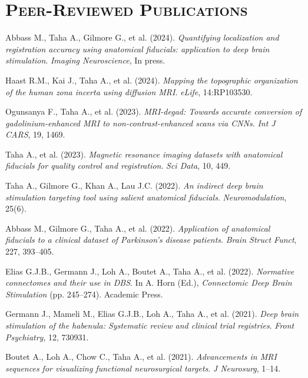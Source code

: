 \section*{\textsc{Peer-Reviewed Publications}} \noindent\hrulefill \vspace{0.5em}
  \item Abbass M., Taha A., Gilmore G., et al. (2024). \textit{Quantifying localization and registration accuracy using anatomical fiducials: application to deep brain stimulation}. \textit{Imaging Neuroscience}, In press.
  \item Haast R.M., Kai J., Taha A., et al. (2024). \textit{Mapping the topographic organization of the human zona incerta using diffusion MRI}. \textit{eLife}, 14:RP103530.
  \item Ogunsanya F., Taha A., et al. (2023). \textit{MRI-degad: Towards accurate conversion of gadolinium-enhanced MRI to non-contrast-enhanced scans via CNNs}. \textit{Int J CARS}, 19, 1469.
  \item Taha A., et al. (2023). \textit{Magnetic resonance imaging datasets with anatomical fiducials for quality control and registration}. \textit{Sci Data}, 10, 449.
  \item Taha A., Gilmore G., Khan A., Lau J.C. (2022). \textit{An indirect deep brain stimulation targeting tool using salient anatomical fiducials}. \textit{Neuromodulation}, 25(6).
  \item Abbass M., Gilmore G., Taha A., et al. (2022). \textit{Application of anatomical fiducials to a clinical dataset of Parkinson’s disease patients}. \textit{Brain Struct Funct}, 227, 393–405.
  \item Elias G.J.B., Germann J., Loh A., Boutet A., Taha A., et al. (2022). \textit{Normative connectomes and their use in DBS}. In A. Horn (Ed.), \textit{Connectomic Deep Brain Stimulation} (pp. 245–274). Academic Press.
  \item Germann J., Mameli M., Elias G.J.B., Loh A., Taha A., et al. (2021). \textit{Deep brain stimulation of the habenula: Systematic review and clinical trial registries}. \textit{Front Psychiatry}, 12, 730931.
  \item Boutet A., Loh A., Chow C., Taha A., et al. (2021). \textit{Advancements in MRI sequences for visualizing functional neurosurgical targets}. \textit{J Neurosurg}, 1–14.
\vspace{0.5em}
